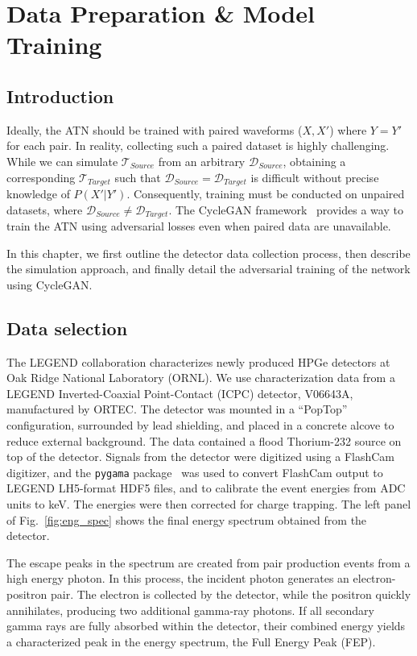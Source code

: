 \chapter{Data Preparation \& Model Training} \label{chap:training}

\section{Introduction}
Ideally, the ATN should be trained with paired waveforms ($X, X'$) where $Y=Y'$ for each pair. In reality, collecting such a paired dataset is highly challenging. While we can simulate $\mathcal{T}_{Source}$ from an arbitrary $\mathcal{D}_{Source}$, obtaining a corresponding $\mathcal{T}_{Target}$ such that $\mathcal{D}_{Source} = \mathcal{D}_{Target}$ is difficult without precise knowledge of $P(X'|Y')$. Consequently, training must be conducted on unpaired datasets, where $\mathcal{D}_{Source} \neq \mathcal{D}_{Target}$. The CycleGAN framework~\cite{CycleGAN} provides a way to train the ATN using adversarial losses even when paired data are unavailable.

In this chapter, we first outline the detector data collection process, then describe the simulation approach, and finally detail the adversarial training of the network using CycleGAN.

\section{Data selection}

The LEGEND collaboration characterizes newly produced HPGe detectors at Oak Ridge National Laboratory (ORNL). We use characterization data from a LEGEND Inverted-Coaxial Point-Contact (ICPC) detector, V06643A, manufactured by ORTEC. The detector was mounted in a “PopTop” configuration, surrounded by lead shielding, and placed in a concrete alcove to reduce external background. The data contained a flood Thorium-232 source on top of the detector. Signals from the detector were digitized using a FlashCam digitizer, and the \texttt{pygama} package~\cite{pygama} was used to convert FlashCam output to LEGEND LH5-format HDF5 files, and to calibrate the event energies from ADC units to keV. The energies were then corrected for charge trapping. The left panel of Fig.~\ref{fig:eng_spec} shows the final energy spectrum obtained from the detector.


The escape peaks in the spectrum are created from pair production events from a high energy photon. In this process, the incident photon generates an electron-positron pair. The electron is collected by the detector, while the positron quickly annihilates, producing two additional gamma-ray photons. If all secondary gamma rays are fully absorbed within the detector, their combined energy yields a characterized peak in the energy spectrum, the Full Energy Peak (FEP).


